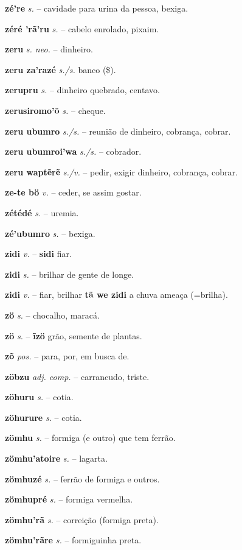 \textbf{zé're} \textit{s.} -- cavidade para urina da pessoa, bexiga.

\textbf{zéré 'rã'ru} \textit{s.} -- cabelo enrolado, pixaim.

\textbf{zeru} \textit{s. neo.} -- dinheiro.

\textbf{zeru za'razé} \textit{s./s.} banco (\$).

\textbf{zerupru} \textit{s.} -- dinheiro quebrado, centavo.

\textbf{zerusiromo'õ} \textit{s.} -- cheque.

\textbf{zeru ubumro} \textit{s./s.} -- reunião de dinheiro, cobrança, cobrar.

\textbf{zeru ubumroi'wa} \textit{s./s.} -- cobrador.

\textbf{zeru waptẽrẽ} \textit{s./v.} -- pedir, exigir dinheiro, cobrança, cobrar.

\textbf{ze-te bö} \textit{v.} -- ceder, se assim gostar.

\textbf{zétédé} \textit{s.} -- uremia.

\textbf{zé'ubumro} \textit{s.} -- bexiga.

\textbf{zidi} \textit{v.} -- \textbf{sidi} fiar.

\textbf{zidi} \textit{s.} -- brilhar de gente de longe.

\textbf{zidi} \textit{v.} -- fiar, brilhar  \textbf{tã we zidi} a chuva ameaça (=brilha).

\textbf{zö} \textit{s.} -- chocalho, maracá.

\textbf{zö} \textit{s.} -- \textbf{ĩzö} grão, semente de plantas.

\textbf{zõ} \textit{pos.} -- para, por, em busca de.

\textbf{zöbzu} \textit{adj. comp.} -- carrancudo, triste.

\textbf{zöhuru} \textit{s.} -- cotia.

\textbf{zöhurure} \textit{s.} -- cotia.

\textbf{zömhu} \textit{s.} -- formiga (e outro) que tem ferrão.

\textbf{zömhu'atoire} \textit{s.} -- lagarta.

\textbf{zömhuzé} \textit{s.} -- ferrão de formiga e outros.

\textbf{zömhupré} \textit{s.} -- formiga vermelha.

\textbf{zömhu'rã} \textit{s.} -- correição (formiga preta).

\textbf{zömhu'rãre} \textit{s.} -- formiguinha preta.

